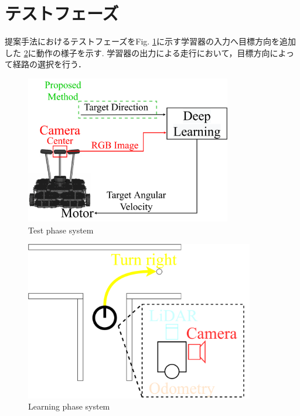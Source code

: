 \section{テストフェーズ}
\label{test}
提案手法におけるテストフェーズをFig. \ref{fig::testsystem}に示す学習器の入力へ目標方向を追加した
\ref{fig::test_abs}に動作の様子を示す.
学習器の出力による走行において，目標方向によって経路の選択を行う．


\begin{figure}[h]
    \centering
    \includegraphics[width = 9cm]{./figs/system_test.pdf}
    \caption{Test phase system}
    \label{fig::testsystem}
\end{figure}
\begin{figure}[h]
  \centering
  \includegraphics[width = 10cm]{./figs/test_abs.pdf}
  \caption{Learning phase system }
  \label{fig::test_abs}
\end{figure}
\newpage
